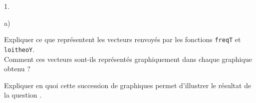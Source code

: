 \begin{noliste}{1.}
  \begin{noliste}{a)}
  \item Expliquer ce que représentent les vecteurs renvoyés par les
    fonctions {\tt freqT} et {\tt loitheoY}. \\
    Comment ces vecteurs sont-ils représentés graphiquement dans
    chaque graphique obtenu ?
  
    
    
    


  \item Expliquer en quoi cette succession de graphiques permet
    d'illustrer le résultat de la question .
  
        
  \end{noliste}
\end{noliste}


